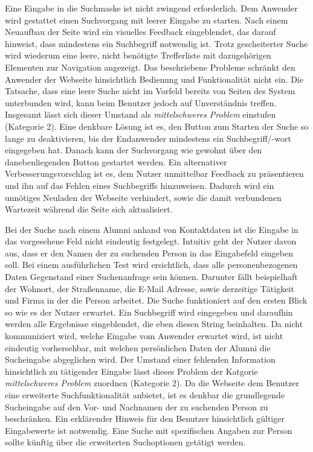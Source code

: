 {
	Eine Eingabe in die Suchmaske ist nicht zwingend erforderlich. Dem Anwender wird gestattet einen Suchvorgang mit leerer Eingabe zu starten. Nach einem Neuaufbau der Seite wird ein visuelles Feedback eingeblendet, das darauf hinweist, dass mindestens ein Suchbegriff notwendig ist. Trotz gescheiterter Suche wird wiederum eine leere, nicht benötigte Trefferliste mit dazugehörigen Elementen zur Navigation angezeigt.
}
{
	Das beschriebene Probleme schränkt den Anwender der Webseite hinsichtlich Bedienung und Funktionalität nicht ein. Die Tatsache, dass eine leere Suche nicht im Vorfeld bereits von Seiten des System unterbunden wird, kann beim Benutzer jedoch auf Unverständnis treffen. Insgesamt lässt sich dieser Umstand als \emph{mittelschweres Problem} einstufen (Kategorie 2).
}
{
	Eine denkbare Lösung ist es, den Button zum Starten der Suche so lange zu deaktivieren, bis der Endanwender mindestens ein Suchbegriff/-wort eingegeben hat. Danach kann der Suchvorgang wie gewohnt über den danebenliegenden Button gestartet werden. Ein alternativer Verbesserungsvorschlag ist es, dem Nutzer unmittelbar Feedback zu präsentieren und ihn auf das Fehlen eines Suchbegriffs hinzuweisen. Dadurch wird ein unnötiges Neuladen der Webseite verhindert, sowie die damit verbundenen Wartezeit während die Seite sich aktualisiert.
}
\label{prob:suche:leereeingabe}

{
	Bei der Suche nach einem Alumni anhand von Kontaktdaten ist die Eingabe in das vorgesehene Feld nicht eindeutig festgelegt. Intuitiv geht der Nutzer davon aus, dass er den Namen der zu suchenden Person in das Eingabefeld eingeben soll. Bei einem ausführlichen Test wird ersichtlich, dass alle personenbezogenen Daten Gegenstand einer Suchenanfrage sein können. Darunter fällt beispielhaft der Wohnort, der Straßenname, die E-Mail Adresse, sowie derzeitige Tätigkeit und Firma in der die Person arbeitet.
}
{
	Die Suche funktioniert auf den ersten Blick so wie es der Nutzer erwartet. Ein Suchbegriff wird eingegeben und daraufhin werden alle Ergebnisse eingeblendet, die eben diesen String  beinhalten. Da nicht kommuniziert wird, welche Eingabe vom Anwender erwartet wird, ist nicht eindeutig vorhersehbar, mit welchen persönlichen Daten der Alumni die Sucheingabe abgeglichen wird. Der Umstand einer fehlenden Information hinsichtlich zu tätigender Eingabe lässt dieses Problem der Katgorie \emph{mittelschweres Problem} zuordnen (Kategorie 2).
}
{
	Da die Webseite dem Benutzer eine erweiterte Suchfunktionalität anbietet, ist es denkbar die grundlegende Sucheingabe auf den Vor- und Nachnamen der zu suchenden Person zu beschränken. Ein erklärender Hinweis für den Benutzer hinsichtlich gültiger Eingabewerte ist notwendig. Eine Suche mit spezifischen Angaben zur Person sollte künftig über die erweiterten Suchoptionen getätigt werden.
}
\label{prob:suche:eingabeuneindeutig}

